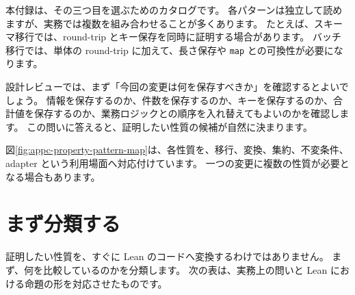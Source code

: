 本付録は、その三つ目を選ぶためのカタログです。
各パターンは独立して読めますが、実務では複数を組み合わせることが多くあります。
たとえば、スキーマ移行では、round-trip とキー保存を同時に証明する場合があります。
バッチ移行では、単体の round-trip に加えて、長さ保存や \texttt{map} との可換性が必要になります。

設計レビューでは、まず「今回の変更は何を保存すべきか」を確認するとよいでしょう。
情報を保存するのか、件数を保存するのか、キーを保存するのか、合計値を保存するのか、業務ロジックとの順序を入れ替えてもよいのかを確認します。
この問いに答えると、証明したい性質の候補が自然に決まります。


図\ref{fig:appc-property-pattern-map}は、各性質を、移行、変換、集約、不変条件、adapter という利用場面へ対応付けています。
一つの変更に複数の性質が必要となる場合もあります。

\section{まず分類する}

証明したい性質を、すぐに Lean のコードへ変換するわけではありません。
まず、何を比較しているのかを分類します。
次の表は、実務上の問いと Lean における命題の形を対応させたものです。

